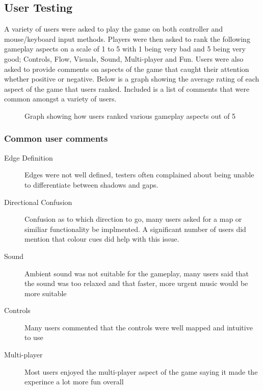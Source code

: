 \documentclass[11pt,a4paper]{article}
\begin{document}
\subsection {User Testing}
A variety of users were asked to play the game on both controller and mouse/keyboard input methods. Players were then asked to rank the following gameplay aspects on a scale of 1 to 5 with 1 being very bad and 5 being very good; Controls, Flow, Visuals, Sound, Multi-player and Fun. Users were also asked to provide comments on aspects of the game that caught their attention whether positive or negative. Below is a graph showing the average rating of each aspect of the game that users ranked. Included is a list of comments that were common amongst a variety of users.
\begin{figure}[H]
	\caption{Graph showing how users ranked various gameplay aspects out of 5}
	\label{fig:userTestGraph}
\end{figure}
\subsubsection{Common user comments}
\begin{description}
	\item [Edge Definition] Edges were not well defined, testers often complained about being unable to differentiate between shadows and gaps.
	\item [Directional Confusion] Confusion as to which direction to go, many users asked for a map or similiar functionality be implmented. A significant number of users did mention that colour cues did help with this issue.
	\item [Sound] Ambient sound was not suitable for the gameplay, many users said that the sound was too relaxed and that faster, more urgent music would be more suitable
	\item [Controls] Many users commented that the controls were well mapped and intuitive to use
	\item [Multi-player] Most users enjoyed the multi-player aspect of the game saying it made the experince a lot more fun overall
\end{description}
\end{document}
